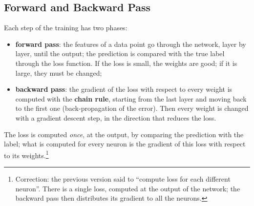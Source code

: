 \subsection{Forward and Backward Pass}
Each step of the training has two phases:
\begin{itemize}
    \item \textbf{forward pass}: the features of a data point go through the network, layer by layer, until the output; the prediction is compared with the true label through the loss function. If the loss is small, the weights are good; if it is large, they must be changed;
    \item \textbf{backward pass}: the gradient of the loss with respect to every weight is computed with the \textbf{chain rule}, starting from the last layer and moving back to the first one (back-propagation of the error). Then every weight is changed with a gradient descent step, in the direction that reduces the loss.
\end{itemize}

\begin{center}
\end{center}
The loss is computed \emph{once}, at the output, by comparing the prediction with the label; what is computed for every neuron is the gradient of this loss with respect to its weights.\footnote{Correction: the previous version said to ``compute loss for each different neuron''. There is a single loss, computed at the output of the network; the backward pass then distributes its gradient to all the neurons.}


